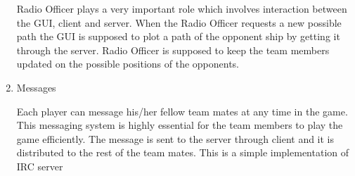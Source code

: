 \begin{enumerate}
Radio Officer plays a very important role which involves interaction between the GUI, client and server. When the Radio Officer requests a new possible path the GUI is supposed to plot a path of the opponent ship by getting it through the server. Radio Officer is supposed to keep the team members updated on the possible positions of the opponents.

\item Messages


Each player can message his/her fellow team mates at any time in the game. This messaging system is highly essential for the team members to play the game efficiently. The message is sent to the server through client and it is distributed to the rest of the team mates. This is a simple implementation of IRC server

\end{enumerate}